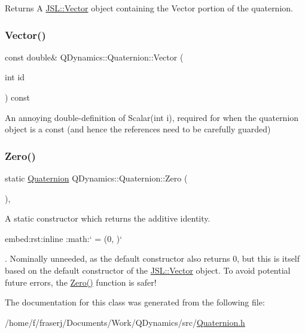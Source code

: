 \begin{DoxyReturn}{Returns}
A \hyperlink{classJSL_1_1Vector}{J\+S\+L\+::\+Vector} object containing the Vector portion of the quaternion. 
\end{DoxyReturn}
\mbox{\label{classQDynamics_1_1Quaternion_a061cd74a6e060beeeb781b6cf7b7f16d}} 
\subsubsection{\texorpdfstring{Vector()}{Vector()}\hspace{0.1cm}{\footnotesize\ttfamily [3/3]}}
{\footnotesize\ttfamily const double\& Q\+Dynamics\+::\+Quaternion\+::\+Vector (\begin{DoxyParamCaption}\item[{int}]{id }\end{DoxyParamCaption}) const\hspace{0.3cm}{\ttfamily [inline]}}



An annoying double-\/definition of Scalar(int i), required for when the quaternion object is a const (and hence the references need to be carefully guarded) 

\mbox{\label{classQDynamics_1_1Quaternion_a7932eeb535080e6230e98fb4f35867c2}} 
\subsubsection{\texorpdfstring{Zero()}{Zero()}}
{\footnotesize\ttfamily static \hyperlink{classQDynamics_1_1Quaternion}{Quaternion} Q\+Dynamics\+::\+Quaternion\+::\+Zero (\begin{DoxyParamCaption}{ }\end{DoxyParamCaption})\hspace{0.3cm}{\ttfamily [inline]}, {\ttfamily [static]}}



A static constructor which returns the additive identity. 

\begin{DoxyVerb}embed:rst:inline :math:` = \left(0, \right)` \end{DoxyVerb}
. Nominally unneeded, as the default constructor also returns 0, but this is itself based on the default constructor of the \hyperlink{classJSL_1_1Vector}{J\+S\+L\+::\+Vector} object. To avoid potential future errors, the \hyperlink{classQDynamics_1_1Quaternion_a7932eeb535080e6230e98fb4f35867c2}{Zero()} function is safer! 

The documentation for this class was generated from the following file\+:\begin{DoxyCompactItemize}
\item 
/home/f/fraserj/\+Documents/\+Work/\+Q\+Dynamics/src/\hyperlink{Quaternion_8h}{Quaternion.\+h}\end{DoxyCompactItemize}
